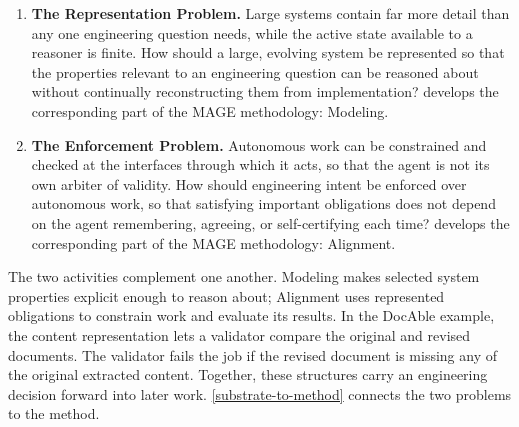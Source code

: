 


\begin{enumerate}
\def\labelenumi{\arabic{enumi}.}
\tightlist
\item
  \textbf{The Representation Problem.} Large systems contain far more detail than any one engineering question needs, while the active state available to a reasoner is finite. How should a large, evolving system be represented so that the properties relevant to an engineering question can be reasoned about without continually reconstructing them from implementation?  develops the corresponding part of the MAGE methodology: Modeling.
\item
  \textbf{The Enforcement Problem.} Autonomous work can be constrained and checked at the interfaces through which it acts, so that the agent is not its own arbiter of validity. How should engineering intent be enforced over autonomous work, so that satisfying important obligations does not depend on the agent remembering, agreeing, or self-certifying each time?  develops the corresponding part of the MAGE methodology: Alignment.
\end{enumerate}


The two activities complement one another. Modeling makes selected system properties explicit enough to reason about; Alignment uses represented obligations to constrain work and evaluate its results. In the DocAble example, the content representation lets a validator compare the original and revised documents. The validator fails the job if the revised document is missing any of the original extracted content. Together, these structures carry an engineering decision forward into later work. \autoref{substrate-to-method} connects the two problems to the method.

